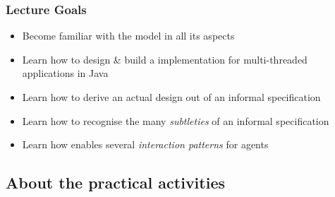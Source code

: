 \documentclass[presentation]{beamer}\mode<presentation>{\usetheme{AMSCesenaPurpleAndGold}}
\begin{document}
\begin{frame}
	\frametitle{Lecture Goals}

	\begin{itemize}

		\item Become familiar with the \linda{} model in all its aspects

		\vfill

		\item Learn how to \alert{design \& build} a \linda{} implementation for multi-threaded applications in Java

		\vfill

		\item Learn how to derive an actual design out of an informal specification

		\vfill

		\item Learn how to recognise the many \emph{subtleties} of an informal specification

		\vfill

		\item Learn how \linda{} enables several \emph{interaction patterns} for agents

	\end{itemize}

\end{frame}

\subsection{About the practical activities}
\end{document}
